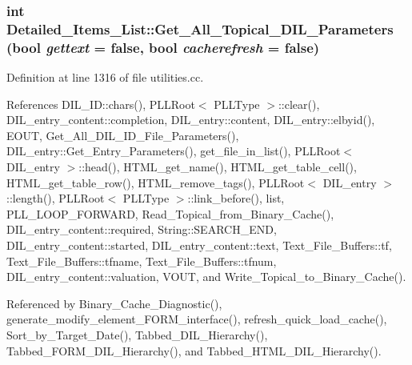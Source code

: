 \subsubsection{\setlength{\rightskip}{0pt plus 5cm}int Detailed\_\-Items\_\-List::Get\_\-All\_\-Topical\_\-DIL\_\-Parameters (bool {\em gettext} = {\bf false}, bool {\em cacherefresh} = {\bf false})}\label{classDetailed__Items__List_a3}




Definition at line 1316 of file utilities.cc.

References DIL\_\-ID::chars(), PLLRoot$<$ PLLType $>$::clear(), DIL\_\-entry\_\-content::completion, DIL\_\-entry::content, DIL\_\-entry::elbyid(), EOUT, Get\_\-All\_\-DIL\_\-ID\_\-File\_\-Parameters(), DIL\_\-entry::Get\_\-Entry\_\-Parameters(), get\_\-file\_\-in\_\-list(), PLLRoot$<$ DIL\_\-entry $>$::head(), HTML\_\-get\_\-name(), HTML\_\-get\_\-table\_\-cell(), HTML\_\-get\_\-table\_\-row(), HTML\_\-remove\_\-tags(), PLLRoot$<$ DIL\_\-entry $>$::length(), PLLRoot$<$ PLLType $>$::link\_\-before(), list, PLL\_\-LOOP\_\-FORWARD, Read\_\-Topical\_\-from\_\-Binary\_\-Cache(), DIL\_\-entry\_\-content::required, String::SEARCH\_\-END, DIL\_\-entry\_\-content::started, DIL\_\-entry\_\-content::text, Text\_\-File\_\-Buffers::tf, Text\_\-File\_\-Buffers::tfname, Text\_\-File\_\-Buffers::tfnum, DIL\_\-entry\_\-content::valuation, VOUT, and Write\_\-Topical\_\-to\_\-Binary\_\-Cache().

Referenced by Binary\_\-Cache\_\-Diagnostic(), generate\_\-modify\_\-element\_\-FORM\_\-interface(), refresh\_\-quick\_\-load\_\-cache(), Sort\_\-by\_\-Target\_\-Date(), Tabbed\_\-DIL\_\-Hierarchy(), Tabbed\_\-FORM\_\-DIL\_\-Hierarchy(), and Tabbed\_\-HTML\_\-DIL\_\-Hierarchy().




